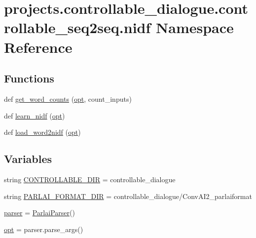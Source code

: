\hypertarget{namespaceprojects_1_1controllable__dialogue_1_1controllable__seq2seq_1_1nidf}{}\section{projects.\+controllable\+\_\+dialogue.\+controllable\+\_\+seq2seq.\+nidf Namespace Reference}
\label{namespaceprojects_1_1controllable__dialogue_1_1controllable__seq2seq_1_1nidf}
\subsection*{Functions}
\begin{DoxyCompactItemize}
\item 
def \hyperlink{namespaceprojects_1_1controllable__dialogue_1_1controllable__seq2seq_1_1nidf_ad06ddb173f03a586d8c47c0c40f2f00c}{get\+\_\+word\+\_\+counts} (\hyperlink{namespaceprojects_1_1controllable__dialogue_1_1controllable__seq2seq_1_1nidf_aef7111d92971802c719300bfe5d9f626}{opt}, count\+\_\+inputs)
\item 
def \hyperlink{namespaceprojects_1_1controllable__dialogue_1_1controllable__seq2seq_1_1nidf_afcd3d0cbb49648e760e9875d32f53f19}{learn\+\_\+nidf} (\hyperlink{namespaceprojects_1_1controllable__dialogue_1_1controllable__seq2seq_1_1nidf_aef7111d92971802c719300bfe5d9f626}{opt})
\item 
def \hyperlink{namespaceprojects_1_1controllable__dialogue_1_1controllable__seq2seq_1_1nidf_a2f882ed55572a6f2f7558732a6a692ee}{load\+\_\+word2nidf} (\hyperlink{namespaceprojects_1_1controllable__dialogue_1_1controllable__seq2seq_1_1nidf_aef7111d92971802c719300bfe5d9f626}{opt})
\end{DoxyCompactItemize}
\subsection*{Variables}
\begin{DoxyCompactItemize}
\item 
string \hyperlink{namespaceprojects_1_1controllable__dialogue_1_1controllable__seq2seq_1_1nidf_a56dd641e98e0dbc6b67b18bb0273abf2}{C\+O\+N\+T\+R\+O\+L\+L\+A\+B\+L\+E\+\_\+\+D\+IR} = \textquotesingle{}controllable\+\_\+dialogue\textquotesingle{}
\item 
string \hyperlink{namespaceprojects_1_1controllable__dialogue_1_1controllable__seq2seq_1_1nidf_a8277b85519dcddac2bdb34598844abfc}{P\+A\+R\+L\+A\+I\+\_\+\+F\+O\+R\+M\+A\+T\+\_\+\+D\+IR} = \textquotesingle{}controllable\+\_\+dialogue/Conv\+A\+I2\+\_\+parlaiformat\textquotesingle{}
\item 
\hyperlink{namespaceprojects_1_1controllable__dialogue_1_1controllable__seq2seq_1_1nidf_a4422dfd9be2af0e9f9481a2a5c33af92}{parser} = \hyperlink{classparlai_1_1core_1_1params_1_1ParlaiParser}{Parlai\+Parser}()
\item 
\hyperlink{namespaceprojects_1_1controllable__dialogue_1_1controllable__seq2seq_1_1nidf_aef7111d92971802c719300bfe5d9f626}{opt} = parser.\+parse\+\_\+args()
\end{DoxyCompactItemize}


